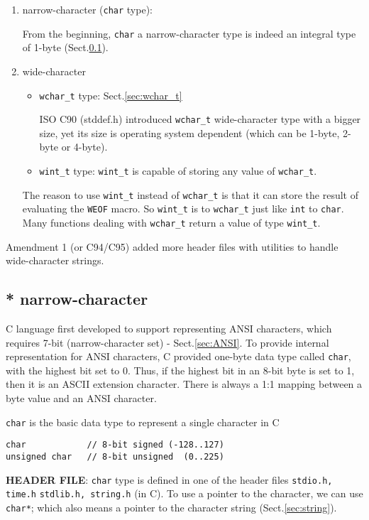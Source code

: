 \begin{enumerate}
  \item narrow-character (\verb!char! type):

From the beginning, \verb!char! a narrow-character type is indeed an integral
type of 1-byte (Sect.\ref{sec:character-narrow}).   
  
  \item wide-character 
  \begin{itemize}
  \item \verb!wchar_t! type: Sect.\ref{sec:wchar_t}

  ISO C90 (stddef.h) introduced \verb!wchar_t! wide-character type with a bigger
  size, yet its size is operating system dependent (which can be 1-byte, 2-byte
  or 4-byte).

  \item \verb!wint_t! type: \verb!wint_t! is capable of storing any
  value of \verb!wchar_t!.
  \end{itemize}
The reason to use \verb!wint_t! instead of \verb!wchar_t! is that it can store
the result of evaluating the \verb!WEOF! macro. So \verb!wint_t! is to
\verb!wchar_t! just like \verb!int! to \verb!char!. Many functions dealing with
\verb!wchar_t! return a value of type \verb!wint_t!.
  
\end{enumerate}
Amendment 1 (or C94/C95) added more header files with utilities to handle
wide-character strings.


\subsection{* narrow-character}
\label{sec:character-narrow}

C language first developed to support representing ANSI characters, which
requires 7-bit (narrow-character set) - Sect.\ref{sec:ANSI}. To provide internal
representation for ANSI characters, C provided one-byte data type called
\verb!char!, with the highest bit set to 0. Thus, if the highest bit in an 8-bit
byte is set to 1, then it is an ASCII extension character. There is always a 1:1
mapping between a byte value and an ANSI character.

\verb!char! is the basic data type to represent a single character in C
\begin{verbatim}
char 			// 8-bit signed (-128..127)
unsigned char   // 8-bit unsigned  (0..225)
\end{verbatim}

{\bf HEADER FILE}: \verb!char! type is defined  in one of the header files
\verb!stdio.h, time.h! \verb!stdlib.h, string.h! (in C). To use a pointer to the
character, we can use \verb!char*!; which also means a pointer to the character
string (Sect.\ref{sec:string}).

